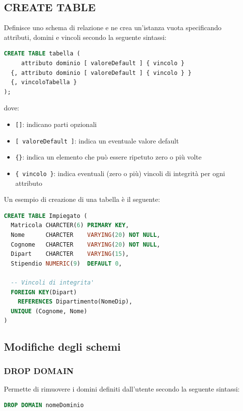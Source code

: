 \documentclass[a4paper]{article}
\begin{document}
\subsection{CREATE TABLE}
Definisce uno schema di relazione e ne crea un'istanza vuota specificando attributi,
domini e vincoli secondo la seguente sintassi:
\begin{lstlisting}[language=SQL]
CREATE TABLE tabella (
     attributo dominio [ valoreDefault ] { vincolo }
  {, attributo dominio [ valoreDefault ] { vincolo } }
  {, vincoloTabella }
);
\end{lstlisting}
dove:
\begin{itemize}
  \item \texttt{[]}: indicano parti opzionali
  \item \texttt{[ valoreDefault ]}: indica un eventuale valore default
  \item \texttt{\{\}}: indica un elemento che può essere ripetuto zero o più volte
  \item \texttt{\{ vincolo \}}: indica eventuali (zero o più) vincoli di integrità per
    ogni attributo
\end{itemize}

\begin{example}
  Un esempio di creazione di una tabella è il seguente:
\begin{lstlisting}[language=SQL]
CREATE TABLE Impiegato (
  Matricola CHARCTER(6) PRIMARY KEY,
  Nome      CHARCTER    VARYING(20) NOT NULL,
  Cognome   CHARCTER    VARYING(20) NOT NULL,
  Dipart    CHARCTER    VARYING(15),
  Stipendio NUMERIC(9)  DEFAULT 0,

  -- Vincoli di integrita'
  FOREIGN KEY(Dipart)
    REFERENCES Dipartimento(NomeDip), 
  UNIQUE (Cognome, Nome)
)
\end{lstlisting}
\end{example}

\subsection{Modifiche degli schemi}
\subsubsection{DROP DOMAIN}
Permette di rimuovere i domini definiti dall'utente secondo la seguente sintassi:
\begin{lstlisting}[language=SQL, numbers=none]
DROP DOMAIN nomeDominio
\end{lstlisting}
\end{document}
